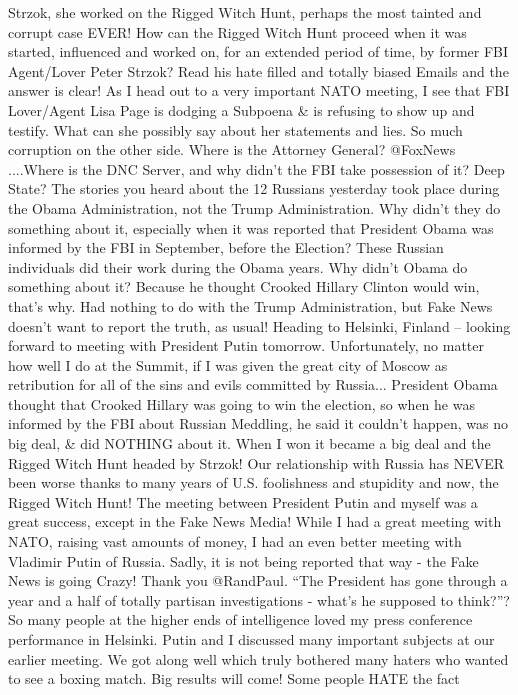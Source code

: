 Strzok, she worked on the Rigged Witch Hunt, perhaps the most tainted
and corrupt case EVER! How can the Rigged Witch Hunt proceed when it was
started, influenced and worked on, for an extended period of time, by
former FBI Agent/Lover Peter Strzok? Read his hate filled and totally
biased Emails and the answer is clear! As I head out to a very important
NATO meeting, I see that FBI Lover/Agent Lisa Page is dodging a Subpoena
\& is refusing to show up and testify. What can she possibly say about
her statements and lies. So much corruption on the other side. Where is
the Attorney General? @FoxNews ....Where is the DNC Server, and why
didn't the FBI take possession of it? Deep State? The stories you heard
about the 12 Russians yesterday took place during the Obama
Administration, not the Trump Administration. Why didn't they do
something about it, especially when it was reported that President Obama
was informed by the FBI in September, before the Election? These Russian
individuals did their work during the Obama years. Why didn't Obama do
something about it? Because he thought Crooked Hillary Clinton would
win, that's why. Had nothing to do with the Trump Administration, but
Fake News doesn't want to report the truth, as usual! Heading to
Helsinki, Finland -- looking forward to meeting with President Putin
tomorrow. Unfortunately, no matter how well I do at the Summit, if I was
given the great city of Moscow as retribution for all of the sins and
evils committed by Russia... President Obama thought that Crooked
Hillary was going to win the election, so when he was informed by the
FBI about Russian Meddling, he said it couldn't happen, was no big deal,
\& did NOTHING about it. When I won it became a big deal and the Rigged
Witch Hunt headed by Strzok! Our relationship with Russia has NEVER been
worse thanks to many years of U.S. foolishness and stupidity and now,
the Rigged Witch Hunt! The meeting between President Putin and myself
was a great success, except in the Fake News Media! While I had a great
meeting with NATO, raising vast amounts of money, I had an even better
meeting with Vladimir Putin of Russia. Sadly, it is not being reported
that way - the Fake News is going Crazy! Thank you @RandPaul. ``The
President has gone through a year and a half of totally partisan
investigations - what's he supposed to think?''? So many people at the
higher ends of intelligence loved my press conference performance in
Helsinki. Putin and I discussed many important subjects at our earlier
meeting. We got along well which truly bothered many haters who wanted
to see a boxing match. Big results will come! Some people HATE the fact
